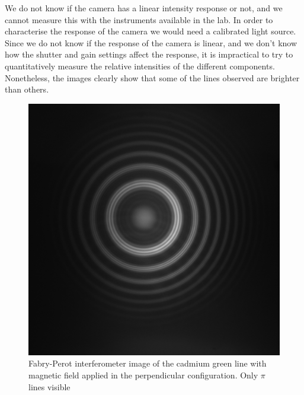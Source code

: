 \documentclass[11pt]{article}
\begin{document}
We do not know if the camera has a linear intensity response or not, and we cannot measure this with the instruments available in the lab. In order to characterise the response of the camera we would need a calibrated light source. Since we do not know if the response of the camera is linear, and we don't know how the shutter and gain settings affect the response, it is impractical to try to quantitatively measure the relative intensities of the different components. Nonetheless, the images clearly show that some of the lines observed are brighter than others. 
\begin{figure}[h!]
    \centering
    \begin{minipage}[t]{0.47\linewidth}
        \includegraphics[width=\linewidth]{mr pi green zeeman 2.png}
        \captionsetup{justification=centering}
        \caption{Fabry-Perot interferometer image of the cadmium green line with magnetic field applied in the perpendicular configuration. Only $\pi$ lines visible}
        \label{img: Cd green pi perp}
    \end{minipage}\hfill
    \begin{minipage}[t]{0.47\linewidth}

\end{minipage}
\end{figure}
\end{document}
